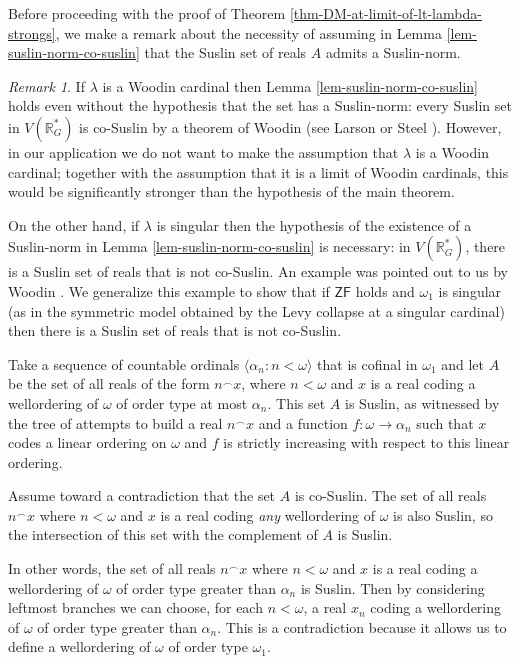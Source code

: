\documentclass[fleqn, 11pt]{amsart}
\theoremstyle{plain}
\theoremstyle{definition}
\theoremstyle{remark}
\newtheorem{rem}[thm]{Remark} \newtheorem*{rem*}{Remark}
\begin{document}
Before proceeding with the proof of Theorem \ref{thm-DM-at-limit-of-lt-lambda-strongs},
we make a remark about the necessity of assuming in Lemma \ref{lem-suslin-norm-co-suslin} that the Suslin set of reals $A$ admits a Suslin-norm.

\begin{rem}\label{rem-woodin-counterexample}
 If $\lambda$ is a Woodin cardinal then Lemma \ref{lem-suslin-norm-co-suslin} holds even without the hypothesis that the set has a Suslin-norm: every Suslin set in $V(\mathbb{R}^*_G)$ is co-Suslin by a theorem of Woodin (see Larson \cite[Theorem 1.5.12]{LarStationaryTower} or Steel \cite[Theorem 4.4]{SteDMT}). However, in our application we do not want to make the assumption that $\lambda$ is a Woodin cardinal; together with the assumption that it is a limit of Woodin cardinals, this would be significantly stronger than the hypothesis of the main theorem.
 
 On the other hand, if $\lambda$ is singular then the hypothesis of the existence of a Suslin-norm in Lemma \ref{lem-suslin-norm-co-suslin} is necessary: in $V(\mathbb{R}^*_G)$, there is a Suslin set of reals that is not co-Suslin. An example was pointed out to us by Woodin \cite{WooSuslinNotCoSuslinEmail}.
 We generalize this example to show that if $\mathsf{ZF}$ holds and $\omega_1$ is singular (as in the symmetric model obtained by the Levy collapse at a singular cardinal) then there is a Suslin set of reals that is not co-Suslin.
 
 Take a sequence of countable ordinals $\langle \alpha_n : n < \omega\rangle$ that is cofinal in $\omega_1$ and let $A$ be the set of all reals of the form $n^\frown x$, where $n < \omega$ and $x$ is a real coding a wellordering of $\omega$ of order type at most $\alpha_n$.
 This set $A$ is Suslin, as witnessed by the tree of attempts to build a real $n^\frown x$ and a function $f : \omega \to \alpha_n$ such that $x$ codes a linear ordering on $\omega$ and $f$ is strictly increasing with respect to this linear ordering.
 
 Assume toward a contradiction that the set $A$ is co-Suslin.
 The set of all reals $n^\frown x$ where $n < \omega$ and $x$ is a real coding \emph{any} wellordering of $\omega$
 is also Suslin, so the intersection of this set with the complement of $A$ is Suslin.
 
 In other words, the set of all reals $n^\frown x$ where $n < \omega$ and $x$ is a real coding a wellordering of $\omega$ of order type greater than $\alpha_n$ is Suslin.
 Then by considering leftmost branches we can choose, for each $n < \omega$, a real $x_n$ coding a wellordering of $\omega$ of order type greater than $\alpha_n$.  This is a contradiction because it allows us to define a wellordering of $\omega$ of order type $\omega_1$.
 

\end{rem}
\end{document}

